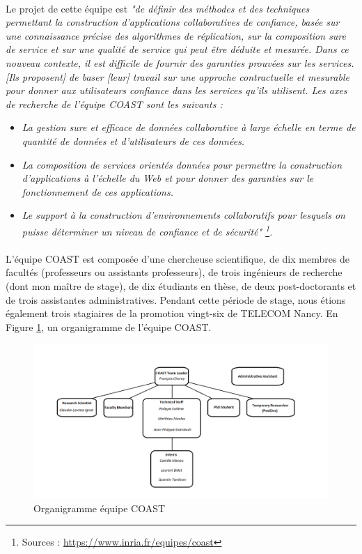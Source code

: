 \documentclass[12pt]{article}
\begin{document}
\paragraph{}
Le projet de cette équipe est \emph{"de définir des méthodes et des techniques permettant la construction d'applications collaboratives de confiance, basée sur une connaissance précise des algorithmes de réplication, sur la composition sure de service et sur une qualité de service qui peut être déduite et mesurée. Dans ce nouveau contexte, il est difficile de fournir des garanties prouvées sur les services. [Ils proposent] de baser [leur] travail sur une approche contractuelle et mesurable pour donner aux utilisateurs confiance dans les services qu'ils utilisent.  
Les axes de recherche de l'équipe COAST sont les suivants :}
\begin{itemize}
  \item \emph{La gestion sure et efficace de données collaborative à large échelle en terme de quantité de données et d'utilisateurs de ces données.}
  \item \emph{La composition de services orientés données pour permettre la construction d'applications à l'échelle du Web et pour donner des garanties sur le fonctionnement de ces applications.}
  \item \emph{Le support à la construction d'environnements collaboratifs pour lesquels on puisse déterminer un niveau de confiance et de sécurité" \footnote{Sources : \href{https://www.inria.fr/equipes/coast}{https://www.inria.fr/equipes/coast}}.}
\end{itemize}

\paragraph{}
L'équipe COAST est composée d'une chercheuse scientifique, de dix membres de facultés (professeurs ou assistants professeurs), de trois ingénieurs de recherche (dont mon maître de stage), de dix étudiants en thèse, de deux post-doctorants et de trois assistantes administratives. Pendant cette période de stage, nous étions également trois stagiaires de la promotion vingt-six de TELECOM Nancy. En Figure \ref{orga}, un organigramme de l'équipe COAST.

\newpage
\begin{figure}[H]
    \centering
    \includegraphics[scale=0.85, angle=90]{gallery/organigrammeCOAST.png}
    \caption[nom dans le sommaire]{Organigramme équipe COAST}
    \label{orga}
\end{figure}
\end{document}
